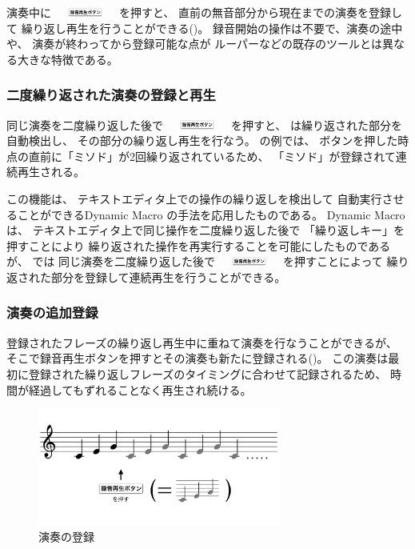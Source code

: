 演奏中に
\includegraphics[height=3mm,width=20mm,bb=3 23 360 80]{images/recbutton.png}
を押すと、
直前の無音部分から現在までの演奏を登録して
繰り返し再生を行うことができる()。
%
録音開始の操作は不要で、演奏の途中や、
演奏が終わってから登録可能な点が
ルーパーなどの既存のツールとは異なる大きな特徴である。

\subsubsection{二度繰り返された演奏の登録と再生}

同じ演奏を二度繰り返した後で
\includegraphics[height=3mm,width=20mm,bb=3 23 360 80]{images/recbutton.png}
を押すと、
{\system}は繰り返された部分を自動検出し、
その部分の繰り返し再生を行なう。
の例では、
ボタンを押した時点の直前に「ミソド」が2回繰り返されているため、
「ミソド」が登録されて連続再生される。

この機能は、
テキストエディタ上での操作の繰り返しを検出して
自動実行させることができるDynamic Macro\cite{masui}
の手法を応用したものである。
Dynamic Macroは、
テキストエディタ上で同じ操作を二度繰り返した後で
「繰り返しキー」を押すことにより
繰り返された操作を再実行することを可能にしたものであるが、
{\system}では
同じ演奏を二度繰り返した後で
\includegraphics[height=3mm,width=20mm,bb=3 23 360 80]{images/recbutton.png}
を押すことによって
繰り返された部分を登録して連続再生を行うことができる。

\subsubsection{演奏の追加登録}

登録されたフレーズの繰り返し再生中に重ねて演奏を行なうことができるが、
そこで録音再生ボタンを押すとその演奏も新たに登録される()。
この演奏は最初に登録された繰り返しフレーズのタイミングに合わせて記録されるため、
時間が経過してもずれることなく再生され続ける。

\begin{figure}[tb]
\includegraphics[width=8cm,bb=0 0 1001 482]{images/rp1.png}
\centering
\caption{演奏の登録}
\label{recplay1}
\end{figure}

